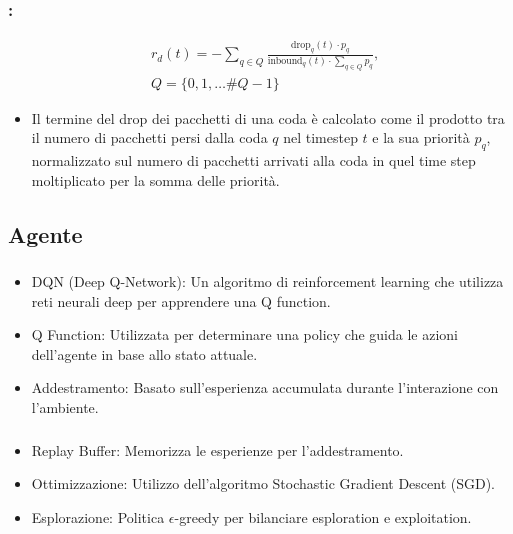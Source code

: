 \documentclass[compress]{beamer}
\begin{document}
\begin{frame}
    \frametitle{\subsecname: \subsubsecname}
    \begin{Definition}
        \begin{equation}
            \label{eq:reward_drop}
            \begin{aligned}
                & r_d(t) = -\sum_{q \in Q}\frac{\text{drop}_q(t) \cdot p_q}{\text{inbound}_q(t) \cdot \sum_{q \in Q}p_q},\\
                & Q = \{0, 1, \dots \#Q - 1\} 
            \end{aligned}
        \end{equation}
    \end{Definition}
    \begin{itemize}
        \item Il termine del drop dei pacchetti di una coda è calcolato come il prodotto tra il numero di pacchetti persi dalla coda $q$ nel 
        timestep $t$ e la sua priorità $p_q$, normalizzato sul numero di pacchetti arrivati alla coda in quel time step moltiplicato per la somma delle priorità.
    \end{itemize}
\end{frame}

\subsection{Agente}
\begin{frame}
    \frametitle{\subsecname}
    \begin{itemize}
        \item DQN (Deep Q-Network): Un algoritmo di reinforcement learning che utilizza reti neurali deep per apprendere una Q function.
        \item Q Function: Utilizzata per determinare una policy che guida le azioni dell'agente in base allo stato attuale.
        \item Addestramento: Basato sull'esperienza accumulata durante l'interazione con l'ambiente.
    \end{itemize}
\end{frame}
\begin{frame}
    \frametitle{\subsecname}
    \begin{itemize}
        \item Replay Buffer: Memorizza le esperienze per l'addestramento.
        \item Ottimizzazione: Utilizzo dell'algoritmo Stochastic Gradient Descent (SGD).
        \item Esplorazione: Politica $\epsilon$-greedy per bilanciare esploration e exploitation.
    \end{itemize}
\end{frame}
\end{document}

